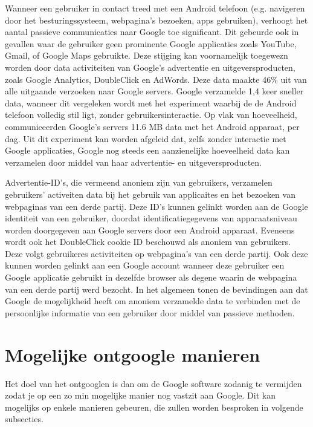 Wanneer een gebruiker in contact treed met een Android telefoon (e.g. navigeren door het besturingssysteem, webpagina's bezoeken, apps gebruiken), verhoogt het aantal passieve communicaties naar Google toe significant. Dit gebeurde ook in gevallen waar de gebruiker geen prominente Google applicaties zoals YouTube, Gmail, of Google Maps gebruikte. Deze stijging kan voornamelijk toegewezn worden door data activiteiten van Google's advertentie en uitgeversproducten, zoals Google Analytics, DoubleClick en AdWords. Deze data maakte 46\% uit van alle uitgaande verzoeken naar Google servers. Google verzamelde 1,4 keer sneller data, wanneer dit vergeleken wordt met het experiment waarbij de de Android telefoon volledig stil ligt, zonder gebruikersinteractie. Op vlak van hoeveelheid, communiceerden Google's servers 11.6 MB data met het Android apparaat, per dag. Uit dit experiment kan worden afgeleid dat, zelfs zonder interactie met Google applicaties, Google nog steeds een aanzienelijke hoeveelheid data kan verzamelen door middel van haar advertentie- en uitgeversproducten.

Advertentie-ID's, die vermeend anoniem zijn van gebruikers, verzamelen  gebruikers' activeiten data bij het gebruik van applicaites en het bezoeken van webpaginas van een derde partij. Deze ID's kunnen gelinkt worden aan de Google identiteit van een gebruiker, doordat identificatiegegevens van apparaatsniveau worden doorgegeven aan Google servers door een Android apparaat. Eveneens wordt ook het DoubleClick cookie ID beschouwd als anoniem van gebruikers. Deze volgt gebruikeres activiteiten op webpagina's van een derde partij. Ook deze kunnen worden gelinkt aan een Google account wanneer deze gebruiker een Google applicatie gebruikt in dezelfde browser als degene waarin de webpagina van een derde partij werd bezocht. In het algemeen tonen de bevindingen aan dat Google de mogelijkheid heeft om anoniem verzamelde data te verbinden met de persoonlijke informatie van een gebruiker door middel van passieve methoden.

\section{Mogelijke ontgoogle manieren}

Het doel van het ontgooglen is dan om de Google software zodanig te vermijden zodat je op  een zo min mogelijke manier nog vastzit aan Google. Dit kan mogelijks op enkele manieren gebeuren, die zullen worden besproken in volgende subsecties.

